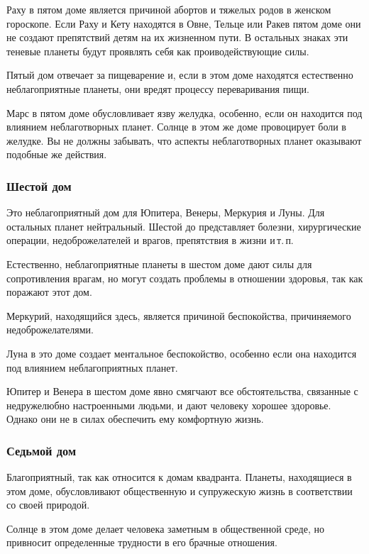 Раху в пятом доме является причиной абортов и тяжелых родов в женском гороскопе. Если Раху и Кету находятся в Овне, Тельце или Ракев пятом доме они не создают препятствий детям на их жизненном пути. В остальных знаках эти теневые планеты будут проявлять себя как проиводействующие силы.

Пятый дом отвечает за пищеварение и, если в этом доме находятся естественно неблагоприятные планеты, они вредят процессу переваривания пищи.

Марс в пятом доме обусловливает язву желудка, особенно, если он находится под влиянием неблаготворных планет. Солнце в этом же доме провоцирует боли в желудке. Вы не должны забывать, что аспекты неблаготворных планет оказывают подобные же действия.

\subsubsection*{Шестой дом}

Это неблагоприятный дом для Юпитера, Венеры, Меркурия и Луны. Для остальных планет нейтральный. Шестой до представляет болезни, хирургические операции, недоброжелателей и врагов, препятствия в жизни и\,т.\,п.

Естественно, неблагоприятные планеты в шестом доме дают силы для сопротивления врагам, но могут создать проблемы в отношении здоровья, так как поражают этот дом.

Меркурий, находящийся здесь, является причиной беспокойства, причиняемого недоброжелателями.

Луна в это доме создает ментальное беспокойство, особенно если она находится под влиянием неблагоприятных планет.

Юпитер и Венера в шестом доме явно смягчают все обстоятельства, связанные с недружелюбно настроенными людьми, и дают человеку хорошее здоровье. Однако они не в силах обеспечить ему комфортную жизнь.

\subsubsection*{Седьмой дом}

Благоприятный, так как относится к домам квадранта. Планеты, находящиеся в этом доме, обусловливают общественную и супружескую жизнь в соответствии со своей природой.

Солнце в этом доме делает человека заметным в общественной среде, но привносит определенные трудности в его брачные отношения.


